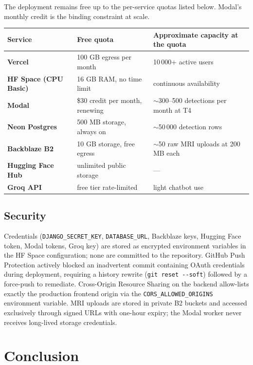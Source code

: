 \documentclass[11pt, a4paper]{article}
\begin{document}
The deployment remains free up to the per-service quotas listed below. Modal's monthly credit is the binding constraint at scale.

\begin{center}
\small
\begin{tabular}{>{\bfseries}p{2.8cm} p{4.5cm} p{8.0cm}}
\toprule
Service & Free quota & Approximate capacity at the quota \\
\midrule
Vercel & 100 GB egress per month & 10\,000+ active users \\
HF Space (CPU Basic) & 16 GB RAM, no time limit & continuous availability \\
Modal & \$30 credit per month, renewing & $\sim$300--500 detections per month at T4 \\
Neon Postgres & 500 MB storage, always on & $\sim$50\,000 detection rows \\
Backblaze B2 & 10 GB storage, free egress & $\sim$50 raw MRI uploads at 200 MB each \\
Hugging Face Hub & unlimited public storage & --- \\
Groq API & free tier rate-limited & light chatbot use \\
\bottomrule
\end{tabular}
\end{center}

\subsection{Security}

Credentials (\texttt{DJANGO\_SECRET\_KEY}, \texttt{DATABASE\_URL}, Backblaze keys, Hugging Face token, Modal tokens, Groq key) are stored as encrypted environment variables in the HF Space configuration; none are committed to the repository. GitHub Push Protection actively blocked an inadvertent commit containing OAuth credentials during deployment, requiring a history rewrite (\texttt{git reset -{}-soft}) followed by a force-push to remediate. Cross-Origin Resource Sharing on the backend allow-lists exactly the production frontend origin via the \texttt{CORS\_ALLOWED\_ORIGINS} environment variable. MRI uploads are stored in private B2 buckets and accessed exclusively through signed URLs with one-hour expiry; the Modal worker never receives long-lived storage credentials.

\section{Conclusion}
\end{document}
